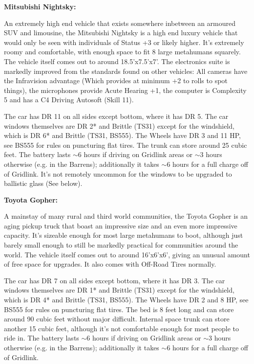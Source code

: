 \textbf{Mitsubishi Nightsky:}

An extremely high end vehicle that exists somewhere inbetween an armoured SUV and limousine, the Mitsubishi Nightsky is a high end luxury vehicle that would only be seen with individuals of Status +3 or likely higher. It's extremely roomy and comfortable, with enough space to fit 8 large metahumans squarely. The vehicle itself comes out to around 18.5'x7.5'x7'. The electronics suite is markedly improved from the standards found on other vehicles: All cameras have the Infravision advantage (Which provides at minimum +2 to rolls to spot things), the microphones provide Acute Hearing +1, the computer is Complexity 5 and has a C4 Driving Autosoft (Skill 11).

The car has DR 11 on all sides except bottom, where it has DR 5. The car windows themselves are DR 2* and Brittle (TS31) except for the windshield, which is DR 6* and Brittle (TS31, BS555). The Wheels have DR 3 and 11 HP, see BS555 for rules on puncturing flat tires. The trunk can store around 25 cubic feet. The battery lasts $\sim$6 hours if driving on Gridlink areas or $\sim$3 hours otherwise (e.g. in the Barrens); additionally it takes $\sim$6 hours for a full charge off of Gridlink. It's not remotely uncommon for the windows to be upgraded to ballistic glass (See below).

\textbf{Toyota Gopher:}

A mainstay of many rural and third world communities, the Toyota Gopher is an aging pickup truck that boast an impressive size and an even more impressive capacity. It's sizeable enough for most large metahumans to boot, although just barely small enough to still be markedly practical for communities around the world. The vehicle itself comes out to around 16'x6'x6', giving an unusual amount of free space for upgrades. It also comes with Off-Road Tires normally.


The car has DR 7 on all sides except bottom, where it has DR 3. The car windows themselves are DR 1* and Brittle (TS31) except for the windshield, which is DR 4* and Brittle (TS31, BS555). The Wheels have DR 2 and 8 HP, see BS555 for rules on puncturing flat tires. The bed is 8 feet long and can store around 90 cubic feet without major difficult. Internal space trunk can store another 15 cubic feet, although it's not comfortable enough for most people to ride in. The battery lasts $\sim$6 hours if driving on Gridlink areas or $\sim$3 hours otherwise (e.g. in the Barrens); additionally it takes $\sim$6 hours for a full charge off of Gridlink.


